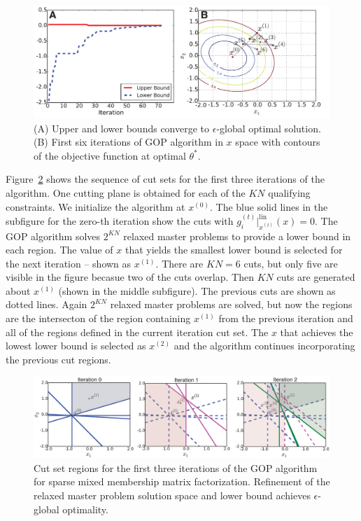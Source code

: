 \documentclass{article} %
\begin{document}
\begin{figure}[ht]
	\centering
		\includegraphics[width=1.0\textwidth]{figs/bounds_and_trace.pdf}
	\caption{(A) Upper and lower bounds converge to $\epsilon$-global optimal solution. (B) First six iterations of GOP algorithm in $x$ space with contours of the objective function at optimal $\theta^*$.}
	\label{fig:figs_bounds_and_trace}
\end{figure}

Figure~\ref{fig:figs_GOP_cutting_plane_sequence} shows the sequence of cut sets
for the first three iterations of the algorithm. One cutting plane is obtained
for each of the $KN$ qualifying constraints. We initialize the algorithm at
$x^{(0)}$. The blue solid lines in the subfigure for the zero-th iteration show
the cuts with $g^{(t)}_i\big\vert^{\text{lin}}_{x^{(t)}}(x) = 0$. The GOP
algorithm solves $2^{KN}$ relaxed master problems to provide a lower bound in
each region. The value of $x$ that yields the smallest lower bound is selected
for the next iteration -- shown as $x^{(1)}$. There are $KN=6$ cuts, but only
five are visible in the figure becasue two of the cuts overlap. Then $KN$ cuts
are generated about $x^{(1)}$ (shown in the middle subfigure). The previous
cuts are shown as dotted lines. Again $2^{KN}$ relaxed master problems are
solved, but now the regions are the intersecton of the region containing
$x^{(1)}$ from the previous iteration and all of the regions defined in the
current iteration cut set. The $x$ that achieves the lowest lower bound is
selected as $x^{(2)}$ and the algorithm continues incorporating the previous
cut regions.


\begin{figure}[ht]
	\centering
		\includegraphics[width=1.0\textwidth]{figs/GOP_cutting_plane_sequence.pdf}
	\caption{Cut set regions for the first three iterations of the GOP algorithm for sparse mixed membership matrix factorization. Refinement of the relaxed master problem solution space and lower bound achieves $\epsilon$-global optimality.}
	\label{fig:figs_GOP_cutting_plane_sequence}
\end{figure}
\end{document}
